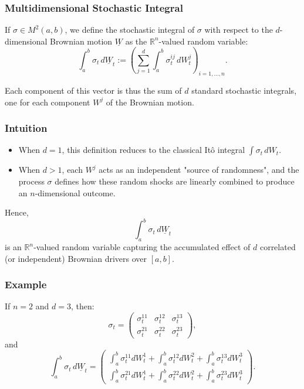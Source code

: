 \documentclass[12pt,a4paper]{article}
\theoremstyle{definition}
\newcommand{\R}{\mathbb{R}}
\begin{document}
\subsubsection{Multidimensional Stochastic Integral}

If $\sigma \in M^2(a,b)$, we define the stochastic integral of $\sigma$ with respect to the $d$-dimensional Brownian motion $\underline{W}$ as the $\R^n$-valued random variable:
\[
\int_a^b \sigma_t \, d\underline{W}_t := \left(\sum_{j=1}^d \int_a^b \sigma_t^{ij} \, dW_t^j\right)_{i=1,\ldots,n}.
\]

Each component of this vector is thus the sum of $d$ standard stochastic integrals, one for each component $W^j$ of the Brownian motion.

\subsubsection{Intuition}

\begin{itemize}
\item When $d = 1$, this definition reduces to the classical Itô integral $\int \sigma_t \, dW_t$.
\item When $d > 1$, each $W^j$ acts as an independent "source of randomness", and the process $\sigma$ defines how these random shocks are linearly combined to produce an $n$-dimensional outcome.
\end{itemize}

Hence,
\[
\int_a^b \sigma_t \, d\underline{W}_t
\]
is an $\R^n$-valued random variable capturing the accumulated effect of $d$ correlated (or independent) Brownian drivers over $[a,b]$.

\subsubsection{Example}

If $n = 2$ and $d = 3$, then:
\[
\sigma_t = \begin{pmatrix}
\sigma_t^{11} & \sigma_t^{12} & \sigma_t^{13} \\
\sigma_t^{21} & \sigma_t^{22} & \sigma_t^{23}
\end{pmatrix},
\]
and
\[
\int_a^b \sigma_t \, d\underline{W}_t = \begin{pmatrix}
\int_a^b \sigma_t^{11} dW_t^1 + \int_a^b \sigma_t^{12} dW_t^2 + \int_a^b \sigma_t^{13} dW_t^3 \\
\int_a^b \sigma_t^{21} dW_t^1 + \int_a^b \sigma_t^{22} dW_t^2 + \int_a^b \sigma_t^{23} dW_t^3
\end{pmatrix}.
\]
\end{document}
